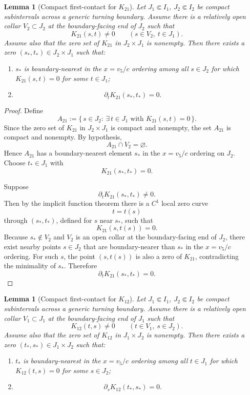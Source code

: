 \documentclass[11pt,a4paper]{amsart}
\theoremstyle{plain}
\newtheorem{lemma}[theorem]{Lemma}
\theoremstyle{definition}
\begin{document}
\begin{lemma}[Compact first-contact for $K_{21}$]
\label{lem:compact-first-contact-k21}
Let $J_1\Subset I_1$, $J_2\Subset I_2$ be compact subintervals across a
generic turning boundary. Assume there is a relatively open collar
$V_2\subset J_2$ at the boundary-facing end of $J_2$ such that
\[
K_{21}(s,t)\neq 0
\qquad
(s\in V_2,\ t\in J_1).
\]
Assume also that the zero set of $K_{21}$ in $J_2\times J_1$ is nonempty.
Then there exists a zero $(s_*,t_*)\in J_2\times J_1$ such that:
\begin{enumerate}
\item $s_*$ is boundary-nearest in the $x=v_5/c$ ordering among all
$s\in J_2$ for which $K_{21}(s,t)=0$ for some $t\in J_1$;
\item
\[
\partial_t K_{21}(s_*,t_*)=0.
\]
\end{enumerate}
\end{lemma}

\begin{proof}
Define
\[
A_{21}:=\{\,s\in J_2:\ \exists\, t\in J_1 \text{ with } K_{21}(s,t)=0\,\}.
\]
Since the zero set of $K_{21}$ in $J_2\times J_1$ is compact and nonempty,
the set $A_{21}$ is compact and nonempty. By hypothesis,
\[
A_{21}\cap V_2=\varnothing.
\]
Hence $A_{21}$ has a boundary-nearest element $s_*$ in the $x=v_5/c$
ordering on $J_2$. Choose $t_*\in J_1$ with
\[
K_{21}(s_*,t_*)=0.
\]

Suppose
\[
\partial_t K_{21}(s_*,t_*)\neq 0.
\]
Then by the implicit function theorem there is a $C^1$ local zero curve
\[
t=t(s)
\]
through $(s_*,t_*)$, defined for $s$ near $s_*$, such that
\[
K_{21}(s,t(s))=0.
\]
Because $s_*\notin V_2$ and $V_2$ is an open collar at the boundary-facing
end of $J_2$, there exist nearby points $s\in J_2$ that are boundary-nearer
than $s_*$ in the $x=v_5/c$ ordering. For such $s$, the point
$(s,t(s))$ is also a zero of $K_{21}$, contradicting the minimality of
$s_*$. Therefore
\[
\partial_t K_{21}(s_*,t_*)=0.
\]
\end{proof}

\begin{lemma}[Compact first-contact for $K_{12}$]
\label{lem:compact-first-contact-k12}
Let $J_1\Subset I_1$, $J_2\Subset I_2$ be compact subintervals across a
generic turning boundary. Assume there is a relatively open collar
$V_1\subset J_1$ at the boundary-facing end of $J_1$ such that
\[
K_{12}(t,s)\neq 0
\qquad
(t\in V_1,\ s\in J_2).
\]
Assume also that the zero set of $K_{12}$ in $J_1\times J_2$ is nonempty.
Then there exists a zero $(t_*,s_*)\in J_1\times J_2$ such that:
\begin{enumerate}
\item $t_*$ is boundary-nearest in the $x=v_5/c$ ordering among all
$t\in J_1$ for which $K_{12}(t,s)=0$ for some $s\in J_2$;
\item
\[
\partial_s K_{12}(t_*,s_*)=0.
\]
\end{enumerate}
\end{lemma}
\end{document}
